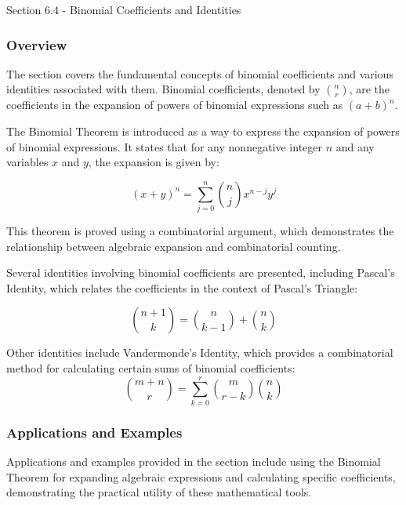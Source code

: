 \begin{notes}{Section 6.4 - Binomial Coefficients and Identities}
    \subsubsection*{Overview}

    The section covers the fundamental concepts of binomial coefficients and various identities associated with them. Binomial coefficients, denoted by $\binom{n}{r}$, are the coefficients in the 
    expansion of powers of binomial expressions such as $(a + b)^n$. \vspace*{1em}
    
    \begin{highlight}
        The Binomial Theorem is introduced as a way to express the expansion of powers of binomial expressions. It states that for any nonnegative integer $ n $ and any variables $ x $ and $ y $, 
        the expansion is given by:
        
        \begin{equation*}
            (x + y)^n = \sum_{j=0}^{n} \binom{n}{j} x^{n-j} y^j
        \end{equation*}
        
        This theorem is proved using a combinatorial argument, which demonstrates the relationship between algebraic expansion and combinatorial counting.
    \end{highlight}
    
    \begin{highlight}
        Several identities involving binomial coefficients are presented, including Pascal's Identity, which relates the coefficients in the context of Pascal's Triangle:
        
        \begin{equation*}
            \binom{n+1}{k} = \binom{n}{k-1} + \binom{n}{k}
        \end{equation*}
        
        Other identities include Vandermonde's Identity, which provides a combinatorial method for calculating certain sums of binomial coefficients:
        \begin{equation*}
            \binom{m+n}{r} = \sum_{k=0}^{r} \binom{m}{r-k}\binom{n}{k}
        \end{equation*}
    \end{highlight}
    
    \subsubsection*{Applications and Examples}
    Applications and examples provided in the section include using the Binomial Theorem for expanding algebraic expressions and calculating specific coefficients, demonstrating the practical utility 
    of these mathematical tools.
    

\end{notes}
